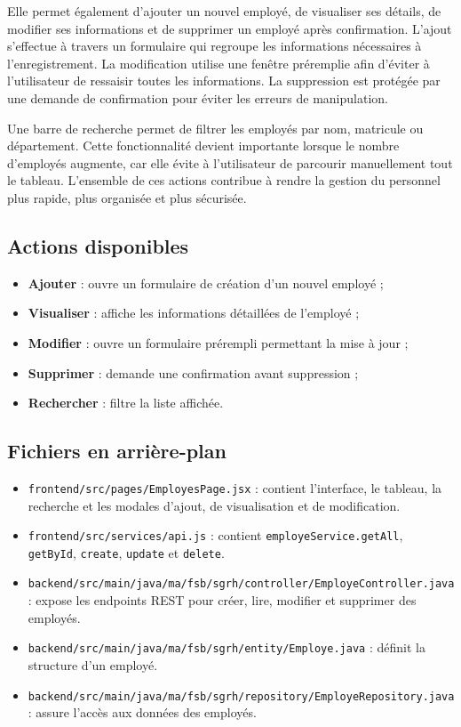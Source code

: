 \documentclass[12pt,a4paper]{report}
\begin{document}
Elle permet également d'ajouter un nouvel employé, de visualiser ses détails, de modifier ses informations et de supprimer un employé après confirmation. L'ajout s'effectue à travers un formulaire qui regroupe les informations nécessaires à l'enregistrement. La modification utilise une fenêtre préremplie afin d'éviter à l'utilisateur de ressaisir toutes les informations. La suppression est protégée par une demande de confirmation pour éviter les erreurs de manipulation.

Une barre de recherche permet de filtrer les employés par nom, matricule ou département. Cette fonctionnalité devient importante lorsque le nombre d'employés augmente, car elle évite à l'utilisateur de parcourir manuellement tout le tableau. L'ensemble de ces actions contribue à rendre la gestion du personnel plus rapide, plus organisée et plus sécurisée.

\subsection{Actions disponibles}

\begin{itemize}
    \item \textbf{Ajouter} : ouvre un formulaire de création d'un nouvel employé ;
    \item \textbf{Visualiser} : affiche les informations détaillées de l'employé ;
    \item \textbf{Modifier} : ouvre un formulaire prérempli permettant la mise à jour ;
    \item \textbf{Supprimer} : demande une confirmation avant suppression ;
    \item \textbf{Rechercher} : filtre la liste affichée.
\end{itemize}

\subsection{Fichiers en arrière-plan}

\begin{itemize}
    \item \texttt{frontend/src/pages/EmployesPage.jsx} : contient l'interface, le tableau, la recherche et les modales d'ajout, de visualisation et de modification.
    \item \texttt{frontend/src/services/api.js} : contient \texttt{employeService.getAll}, \texttt{getById}, \texttt{create}, \texttt{update} et \texttt{delete}.
    \item \texttt{backend/src/main/java/ma/fsb/sgrh/controller/EmployeController.java} : expose les endpoints REST pour créer, lire, modifier et supprimer des employés.
    \item \texttt{backend/src/main/java/ma/fsb/sgrh/entity/Employe.java} : définit la structure d'un employé.
    \item \texttt{backend/src/main/java/ma/fsb/sgrh/repository/EmployeRepository.java} : assure l'accès aux données des employés.
\end{itemize}
\end{document}

